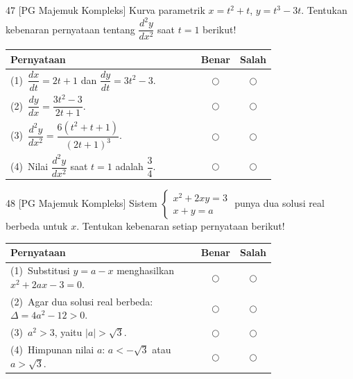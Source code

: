 \documentclass[11pt]{article}
\begin{document}
\begin{soal}{47 \normalfont\small[PG Majemuk Kompleks]}
Kurva parametrik $x=t^2+t$, $y=t^3-3t$. Tentukan kebenaran pernyataan
tentang $\dfrac{d^2y}{dx^2}$ saat $t=1$ berikut!

\par\smallskip
{\renewcommand{\arraystretch}{1.4}%
\begin{tabular}{@{}p{0.76\linewidth}cc@{}}
\hline\textbf{Pernyataan}&\textbf{Benar}&\textbf{Salah}\\\hline
(1)~$\dfrac{dx}{dt}=2t+1$ dan $\dfrac{dy}{dt}=3t^2-3$.&$\bigcirc$&$\bigcirc$\\
(2)~$\dfrac{dy}{dx}=\dfrac{3t^2-3}{2t+1}$.&$\bigcirc$&$\bigcirc$\\
(3)~$\dfrac{d^2y}{dx^2}=\dfrac{6(t^2+t+1)}{(2t+1)^3}$.&$\bigcirc$&$\bigcirc$\\
(4)~Nilai $\dfrac{d^2y}{dx^2}$ saat $t=1$ adalah $\dfrac{3}{4}$.&$\bigcirc$&$\bigcirc$\\\hline
\end{tabular}}
\end{soal}

\begin{soal}{48 \normalfont\small[PG Majemuk Kompleks]}
Sistem $\begin{cases}x^2+2xy=3\\ x+y=a\end{cases}$ punya dua solusi real berbeda untuk $x$.
Tentukan kebenaran setiap pernyataan berikut!

\par\smallskip
{\renewcommand{\arraystretch}{1.4}%
\begin{tabular}{@{}p{0.76\linewidth}cc@{}}
\hline\textbf{Pernyataan}&\textbf{Benar}&\textbf{Salah}\\\hline
(1)~Substitusi $y=a-x$ menghasilkan $x^2+2ax-3=0$.&$\bigcirc$&$\bigcirc$\\
(2)~Agar dua solusi real berbeda: $\Delta=4a^2-12>0$.&$\bigcirc$&$\bigcirc$\\
(3)~$a^2>3$, yaitu $|a|>\sqrt{3}$.&$\bigcirc$&$\bigcirc$\\
(4)~Himpunan nilai $a$: $a<-\sqrt{3}$ atau $a>\sqrt{3}$.&$\bigcirc$&$\bigcirc$\\\hline
\end{tabular}}
\end{soal}
\end{document}

